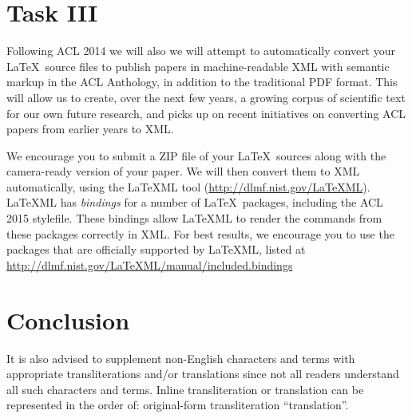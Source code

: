 \documentclass[11pt]{article}
\begin{document}
\section{Task III}

Following ACL 2014 we will also we will attempt to automatically convert
your \LaTeX\ source files to publish papers in machine-readable
XML with semantic markup in the ACL Anthology, in addition to the
traditional PDF format.  This will allow us to create, over the next
few years, a growing corpus of scientific text for our own future research,
and picks up on recent initiatives on converting ACL papers from earlier
years to XML.

We encourage you to submit a ZIP file of your \LaTeX\ sources along
with the camera-ready version of your paper. We will then convert them
to XML automatically, using the LaTeXML tool
(\url{http://dlmf.nist.gov/LaTeXML}). LaTeXML has \emph{bindings} for
a number of \LaTeX\ packages, including the ACL 2015 stylefile. These
bindings allow LaTeXML to render the commands from these packages
correctly in XML. For best results, we encourage you to use the
packages that are officially supported by LaTeXML, listed at
\url{http://dlmf.nist.gov/LaTeXML/manual/included.bindings}




\section{Conclusion}

It is also advised to supplement non-English characters and terms
with appropriate transliterations and/or translations
since not all readers understand all such characters and terms.
Inline transliteration or translation can be represented in
the order of: original-form transliteration ``translation''.
\end{document}
